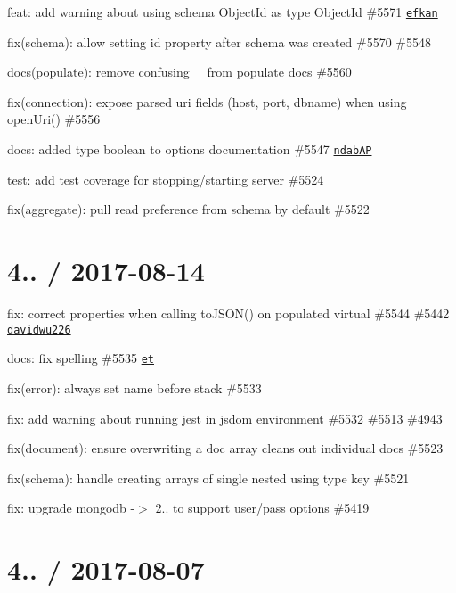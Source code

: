 \begin{DoxyItemize}
\item feat\+: add warning about using schema Object\+Id as type Object\+Id \#5571 \href{https://github.com/efkan}{\tt efkan}
\item fix(schema)\+: allow setting {\ttfamily id} property after schema was created \#5570 \#5548
\item docs(populate)\+: remove confusing \+\_\+ from populate docs \#5560
\item fix(connection)\+: expose parsed uri fields (host, port, dbname) when using open\+Uri() \#5556
\item docs\+: added type boolean to options documentation \#5547 \href{https://github.com/ndabAP}{\tt ndab\+AP}
\item test\+: add test coverage for stopping/starting server \#5524
\item fix(aggregate)\+: pull read preference from schema by default \#5522
\end{DoxyItemize}

\section*{4.. / 2017-\/08-\/14 }


\begin{DoxyItemize}
\item fix\+: correct properties when calling to\+J\+S\+O\+N() on populated virtual \#5544 \#5442 \href{https://github.com/davidwu226}{\tt davidwu226}
\item docs\+: fix spelling \#5535 \href{https://github.com/et}{\tt et}
\item fix(error)\+: always set name before stack \#5533
\item fix\+: add warning about running jest in jsdom environment \#5532 \#5513 \#4943
\item fix(document)\+: ensure overwriting a doc array cleans out individual docs \#5523
\item fix(schema)\+: handle creating arrays of single nested using type key \#5521
\item fix\+: upgrade mongodb -\/$>$ 2.. to support user/pass options \#5419
\end{DoxyItemize}

\section*{4.. / 2017-\/08-\/07 }


